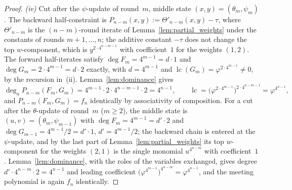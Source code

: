 \documentclass[11pt,a4paper]{article}
\theoremstyle{definition}
\begin{document}
\begin{proof}
\emph{(iv)} Cut after the $\psi$-update of round~$m$, middle state
$(x, y) = (\theta_m, \psi_m)$. The backward half-constraint is
$P_{n-m}(x, y) := \Theta'_{n-m}(x, y) - \tau$, where $\Theta'_{n-m}$
is the $(n-m)$-round iterate of Lemma~\ref{lem:partial_weights} under
the constants of rounds $m+1, \ldots, n$; the additive constant
$-\tau$ does not change the top $w$-component, which is
$y^{2 \cdot 4^{n-m-1}}$ with coefficient~$1$ for the weights
$(1, 2)$. The forward half-iterates satisfy
$\deg F_m = 4^{m-1} = d \cdot 1$ and
$\deg G_m = 2 \cdot 4^{m-1} = d \cdot 2$ exactly, with $d = 4^{m-1}$
and $\operatorname{lc}(G_m) = \varphi^{2 \cdot 4^{m-1}} \ne 0$, by the
recursion in~(ii). Lemma~\ref{lem:dominance} gives
\[
  \deg_a P_{n-m}(F_m, G_m)
   = 4^{m-1} \cdot 2 \cdot 4^{n-m-1} \cdot 2 = 4^{n-1},
  \qquad
  \operatorname{lc}
   = \bigl(\varphi^{2 \cdot 4^{m-1}}\bigr)^{2 \cdot 4^{n-m-1}}
   = \varphi^{4^{n-1}},
\]
and $P_{n-m}(F_m, G_m) = f_n$ identically by associativity of
composition. For a cut after the $\theta$-update of round~$m$
($m \ge 2$), the middle state is $(u, v) = (\theta_m, \psi_{m-1})$
with $\deg F_m = 4^{m-1} = d' \cdot 2$ and
$\deg G_{m-1} = 4^{m-1}/2 = d' \cdot 1$, $d' = 4^{m-1}/2$; the
backward chain is entered at the $\psi$-update, and by the last part
of Lemma~\ref{lem:partial_weights} its top $w$-component for the
weights $(2, 1)$ is the single monomial $u^{4^{n-m}}$ with
coefficient~$1$. Lemma~\ref{lem:dominance}, with the roles of the
variables exchanged, gives degree
$d' \cdot 4^{n-m} \cdot 2 = 4^{n-1}$ and leading coefficient
$\bigl(\varphi^{4^{m-1}}\bigr)^{4^{n-m}} = \varphi^{4^{n-1}}$, and the
meeting polynomial is again $f_n$ identically.
\end{proof}
\end{document}
